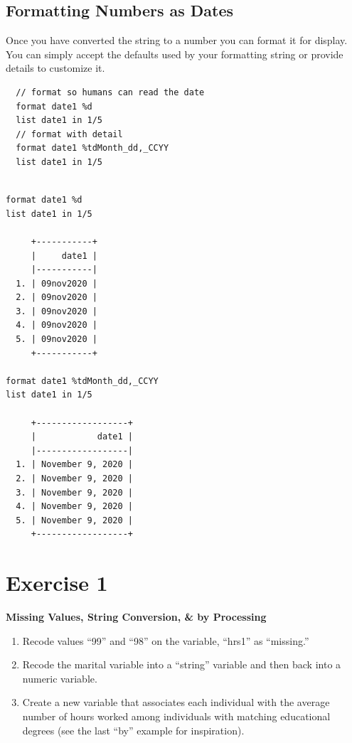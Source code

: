 \documentclass[]{book}
\providecommand{\tightlist}{%
  \setlength{\itemsep}{0pt}\setlength{\parskip}{0pt}}
\begin{document}
\subsection{Formatting Numbers as
Dates}\label{formatting-numbers-as-dates}

Once you have converted the string to a number you can format it for
display. You can simply accept the defaults used by your formatting
string or provide details to customize it.

\begin{verbatim}
  // format so humans can read the date
  format date1 %d
  list date1 in 1/5
  // format with detail
  format date1 %tdMonth_dd,_CCYY
  list date1 in 1/5
\end{verbatim}

\begin{verbatim}

format date1 %d
list date1 in 1/5

     +-----------+
     |     date1 |
     |-----------|
  1. | 09nov2020 |
  2. | 09nov2020 |
  3. | 09nov2020 |
  4. | 09nov2020 |
  5. | 09nov2020 |
     +-----------+

format date1 %tdMonth_dd,_CCYY
list date1 in 1/5

     +------------------+
     |            date1 |
     |------------------|
  1. | November 9, 2020 |
  2. | November 9, 2020 |
  3. | November 9, 2020 |
  4. | November 9, 2020 |
  5. | November 9, 2020 |
     +------------------+
\end{verbatim}

\section{Exercise 1}\label{exercise-1-7}

\textbf{Missing Values, String Conversion, \& by Processing}

\begin{enumerate}
\def\labelenumi{\arabic{enumi}.}
\tightlist
\item
  Recode values ``99'' and ``98'' on the variable, ``hrs1'' as
  ``missing.''
\item
  Recode the marital variable into a ``string'' variable and then back
  into a numeric variable.
\item
  Create a new variable that associates each individual with the average
  number of hours worked among individuals with matching educational
  degrees (see the last ``by'' example for inspiration).
\end{enumerate}
\end{document}
